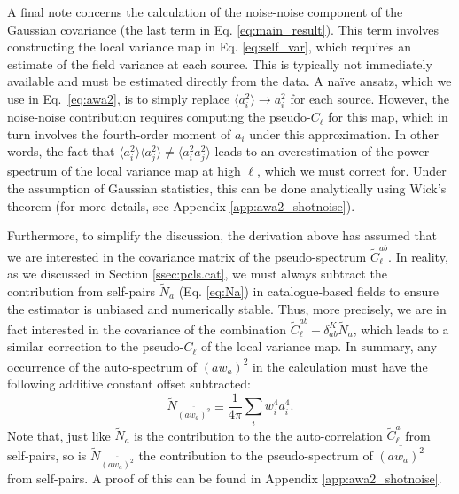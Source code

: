 \documentclass[%
 reprint,
superscriptaddress,
nofootinbib,
 amsmath,amssymb,
 aps,
 prd,
]{revtex4-2}
\begin{document}
    A final note concerns the calculation of the noise-noise component of the Gaussian covariance (the last term in Eq. \ref{eq:main_result}). This term involves constructing the local variance map in Eq. \ref{eq:self_var}, which requires an estimate of the field variance at each source. This is typically not immediately available and must be estimated directly from the data. A na\"ive ansatz, which we use in Eq.~\ref{eq:awa2}, is to simply replace $\langle a_i^2\rangle\rightarrow a_i^2$ for each source. However, the noise-noise contribution requires computing the pseudo-$C_\ell$ for this map, which in turn involves the fourth-order moment of $a_i$ under this approximation. In other words, the fact that $\langle a_i^2\rangle\langle a_j^2\rangle\neq\langle a_i^2a_j^2\rangle$ leads to an overestimation of the power spectrum of the local variance map at high $\ell$, which we must correct for. Under the assumption of Gaussian statistics, this can be done analytically using Wick's theorem (for more details, see Appendix \ref{app:awa2_shotnoise}). 
    
    Furthermore, to simplify the discussion, the derivation above has assumed that we are interested in the covariance matrix of the pseudo-spectrum $\tilde{C}^{ab}_\ell$. In reality, as we discussed in Section \ref{ssec:pcls.cat}, we must always subtract the contribution from self-pairs $\tilde{N}_a$ (Eq. \ref{eq:Na}) in catalogue-based fields to ensure the estimator is unbiased and numerically stable. Thus, more precisely, we are in fact interested in the covariance of the combination $\tilde{C}^{ab}_\ell-\delta_{ab}^K\tilde{N}_a$, which leads to a similar correction to the pseudo-$C_\ell$ of the local variance map. In summary, any occurrence of the auto-spectrum of $\overline{(aw_a)^2}$ in the calculation must have the following additive constant offset subtracted:
    \begin{equation}\label{eq:4point_corr_spin0}
      \tilde{N}_{\overline{(aw_a)^2}}\equiv\frac{1}{4\pi}\sum_iw_i^4a_i^4.
    \end{equation}
    Note that, just like $\tilde{N}_a$ is the contribution to the the auto-correlation $\tilde{C}^a_\ell$ from self-pairs, so is $\tilde{N}_{\overline{(aw_a)^2}}$ the contribution to the pseudo-spectrum of $\overline{(aw_a)^2}$ from self-pairs. A proof of this can be found in Appendix \ref{app:awa2_shotnoise}.
\end{document}
